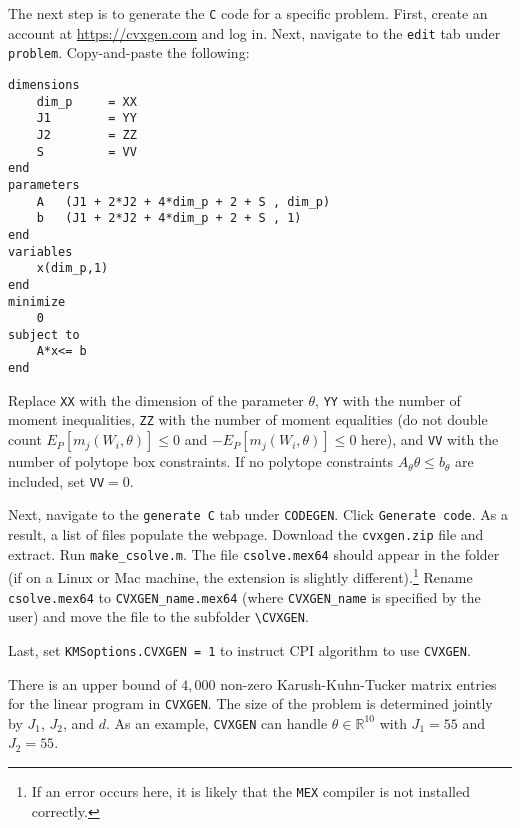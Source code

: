 \documentclass[12pt]{article}
\def\code#1{\texttt{#1}}
\begin{document}
The next step is to generate the \code{C} code for a specific problem.  First, create an account at \url{https://cvxgen.com} and log in.  Next, navigate to the \code{edit} tab under \code{problem}.  Copy-and-paste the following:

\footnotesize
\begin{lstlisting}[backgroundcolor = \color{gray!30},
                   xleftmargin = 0cm,
                   framexleftmargin = 1em]
dimensions
    dim_p     = XX
    J1        = YY
    J2        = ZZ
    S         = VV
end
parameters
    A   (J1 + 2*J2 + 4*dim_p + 2 + S , dim_p)
    b   (J1 + 2*J2 + 4*dim_p + 2 + S , 1)
end
variables
    x(dim_p,1)
end
minimize
    0
subject to
    A*x<= b
end
\end{lstlisting}

 \normalsize
​Replace \code{XX} with the dimension of the parameter $\theta$, \code{YY} with the number of moment inequalities, \code{ZZ} with the number of moment equalities (do not double count $E_P[m_j(W_i,\theta)] \leq 0$ and $-E_P[m_j(W_i,\theta)] \leq 0$ here), and \code{VV} with the number of polytope box constraints.  If no polytope constraints $A_{\theta} \theta \leq b_{\theta}$ are included, set \code{VV}$=0$.

Next, navigate to the \code{generate C} tab under \code{CODEGEN}.  Click \code{Generate code}.  As a result, a list of files populate the webpage.  Download the \code{cvxgen.zip} file and extract.  Run \code{make\_csolve.m}.  The file \code{csolve.mex64} should appear in the folder (if on a Linux or Mac machine, the extension is slightly different).\footnote{If an error occurs here, it is likely that the \code{MEX} compiler is not installed correctly.}  Rename \code{csolve.mex64} to \code{CVXGEN\_name.mex64} (where \code{CVXGEN\_name} is specified by the user) and move the file to the subfolder  \code{\textbackslash CVXGEN}.

Last, set \code{KMSoptions.CVXGEN = 1} to instruct CPI algorithm to use \code{CVXGEN}.

There is an upper bound of $4,000$ non-zero Karush-Kuhn-Tucker matrix entries for the linear program in \code{CVXGEN}.  The size of the problem is determined jointly by $J_1$, $J_2$, and $d$.  As an example, \code{CVXGEN} can handle $\theta \in \mathbb{R}^{10}$ with $J_1 = 55$ and $J_2 = 55$.
\end{document}
